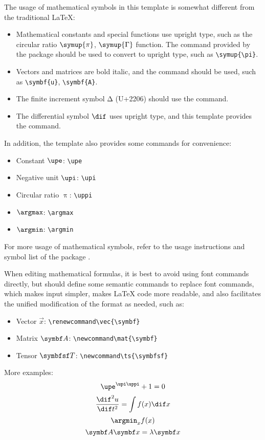 The usage of mathematical symbols in this template is somewhat different from the traditional \LaTeX{}:
\begin{itemize}
  \item Mathematical constants and special functions use upright type,
    such as the circular ratio $\symup{\pi}$, $\symup{\Gamma}$ function.
    The  command provided by the  package should be used to convert to upright type,
    such as \verb|\symup{\pi}|.
  \item Vectors and matrices are bold italic, and the  command should be used,
    such as \verb|\symbf{u}|, \verb|\symbf{A}|.
  \item The finite increment symbol $\increment$ (U+2206) should use the  command.
  \item The differential symbol $\dif$ uses upright type, and this template provides the  command.
\end{itemize}

In addition, the template also provides some commands for convenience:
\begin{itemize}
  \item Constant $\upe$: \verb|\upe|
  \item Negative unit $\upi$: \verb|\upi|
  \item Circular ratio $\uppi$: \verb|\uppi|
  \item $\argmax$: \verb|\argmax|
  \item $\argmin$: \verb|\argmin|
\end{itemize}

For more usage of mathematical symbols, refer to the usage instructions and symbol list of the  package
.

When editing mathematical formulas, it is best to avoid using font commands directly,
but should define some semantic commands to replace font commands,
which makes input simpler, makes \LaTeX{} code more readable,
and also facilitates the unified modification of the format as needed, such as:
\begin{itemize}
  \item Vector $\vec{x}$: \verb|\renewcommand\vec{\symbf}|
  \item Matrix $\mat{A}$: \verb|\newcommand\mat{\symbf}|
  \item Tensor $\ts{T}$: \verb|\newcommand\ts{\symbfsf}|
\end{itemize}

More examples:
\begin{equation}
  \upe^{\upi\uppi} + 1 = 0
\end{equation}
\begin{equation}
  \frac{\dif^2 u}{\dif t^2} = \int f(x) \dif x
\end{equation}
\begin{equation}
  \argmin_x f(x)
\end{equation}
\begin{equation}
  \mat{A} \vec{x} = \lambda \vec{x}
\end{equation}



